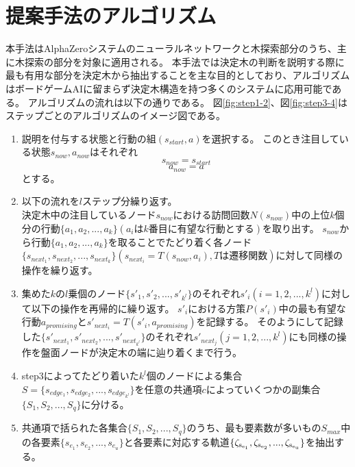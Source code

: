 \section{提案手法のアルゴリズム}
本手法はAlphaZeroシステムのニューラルネットワークと木探索部分のうち、主に木探索の部分を対象に適用される。
本手法では決定木の判断を説明する際に最も有用な部分を決定木から抽出することを主な目的としており、アルゴリズムはボードゲームAIに留まらず決定木構造を持つ多くのシステムに応用可能である。
アルゴリズムの流れは以下の通りである。
図\ref{fig:step1-2}、図\ref{fig:step3-4}はステップごとのアルゴリズムのイメージ図である。
\begin{enumerate}
    \item 説明を付与する状態と行動の組$(s_{start}, a)$を選択する。
    このとき注目している状態$s_{now}, a_{now}$はそれぞれ
    \begin{equation}
        {s_{now}=s_{start}}
    \end{equation}
    \begin{equation}
        {a_{now}=a}
    \end{equation}
    とする。
    \item 以下の流れを$l$ステップ分繰り返す。\\
    決定木中の注目しているノード$s_{now}$における訪問回数$N(s_{now})$中の上位$k$個分の行動$\{a_1, a_2, ..., a_{k}\}(a_iはk番目に有望な行動とする)$を取り出す。
    $s_{now}$から行動$\{a_1, a_2, ..., a_{k}\}$を取ることでたどり着く各ノード
    $\{s_{next_1}, s_{next_2}, ..., s_{next_{k}}\}(s_{next_i}=T(s_{now}, a_i), Tは遷移関数)$に対して同様の操作を繰り返す。
    
    
    \item 集めた$k$の$l$乗個のノード$\{{s}'_{1}, {s'}_{2}, ..., {s'}_{k^l}\}$のそれぞれ${s'}_{i}(i=1, 2, ..., k^l)$に対して以下の操作を再帰的に繰り返す。
    ${s'}_{i}$における方策$P({s'}_{i})$中の最も有望な行動$a_{promising}$と${s'}_{next_i}=T({s'}_i, a_{promising})$を記録する。
    そのようにして記録した$\{{s'}_{next_1}, {s'}_{next_2}, ..., {s'}_{next_{k^l}}\}$のそれぞれ${s'}_{next_j}(j=1, 2, ..., k^l)$にも同様の操作を盤面ノードが決定木の端に辿り着くまで行う。
    \item step3によってたどり着いた$k^l$個のノードによる集合$S=\{s_{edge_1}, s_{edge_2}, ..., s_{edge_{k^l}}\}$を任意の共通項$c$によっていくつかの副集合$\{S_1, S_2, ..., S_q\}$に分ける。
    \item 共通項で括られた各集合$\{S_1, S_2, ..., S_q\}$のうち、最も要素数が多いもの$S_{max}$中の各要素$\{s_{e_1}, s_{e_2}, ...,  s_{e_u}\}$と各要素に対応する軌道$\{\rm{{\zeta}_{s_{e_1}}}, \rm{{\zeta}_{s_{e_2}}}, ...,  \rm{{\zeta}_{s_{e_u}}}\}$を抽出する。
\end{enumerate}
